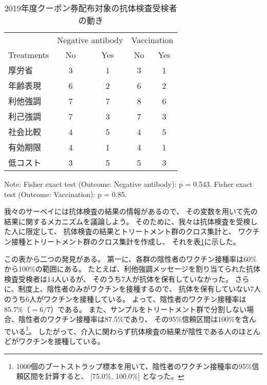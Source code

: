 \documentclass[
  11pt,
  a4paper,
]{article}
\begin{document}
\begin{table}

\caption{\label{tab:show-tester-coupon1}2019年度クーポン券配布対象の抗体検査受検者の動き}
\centering
\begin{threeparttable}
\begin{tabular}[t]{lcccc}
\toprule
\multicolumn{1}{c}{ } & \multicolumn{2}{c}{Negative antibody} & \multicolumn{2}{c}{Vaccination} \\
\cmidrule(l{3pt}r{3pt}){2-3} \cmidrule(l{3pt}r{3pt}){4-5}
Treatments & No & Yes & No  & Yes \\
\midrule
厚労省 & 3 & 1 & 3 & 1\\
年齢表現 & 6 & 2 & 6 & 2\\
利他強調 & 7 & 7 & 8 & 6\\
利己強調 & 7 & 3 & 7 & 3\\
社会比較 & 4 & 5 & 4 & 5\\
有効期限 & 4 & 1 & 4 & 1\\
低コスト & 3 & 5 & 5 & 3\\
\bottomrule
\end{tabular}
\begin{tablenotes}
\item Note: Fisher exact test (Outcome: Negative antibody): p = 0.543. Fisher exact test (Outcome: Vaccination): p = 0.85.
\end{tablenotes}
\end{threeparttable}
\end{table}

我々のサーベイには抗体検査の結果の情報があるので、
その変数を用いて先の結果に関するメカニズムを議論しよう。
そのために、我々は抗体検査を受検した人に限定して、
抗体検査の結果とトリートメント群のクロス集計と、
ワクチン接種とトリートメント群のクロス集計を作成し、
それを表\ref{tab:show-tester-coupon1}に示した。

この表から二つの発見がある。
第一に、各群の陰性者のワクチン接種率は60\%から100\%の範囲にある。
たとえば、利他強調メッセージを割り当てられた抗体検査受検者は14人いるが、
そのうち7人が抗体を保有していなかった。
さらに、制度上、陰性者のみがワクチンを接種するので、
抗体を保有していない7人のうち6人がワクチンを接種している。
よって、陰性者のワクチン接種率は85.7\%（\(=6/7\)）である。
また、サンプルをトリートメント群で分割しない場合、陰性者のワクチン接種率は87.5\%であり、
その95\%信頼区間は100\%を含んでいる\footnote{1000個のブートストラップ標本を用いて、陰性者のワクチン接種率の95\%信頼区間を計算すると、
  {[}75.0\%, 100.0\%{]}
  となった。}。
したがって、介入に関わらず抗体検査の結果が陰性である人のほとんどがワクチンを接種している。
\end{document}
